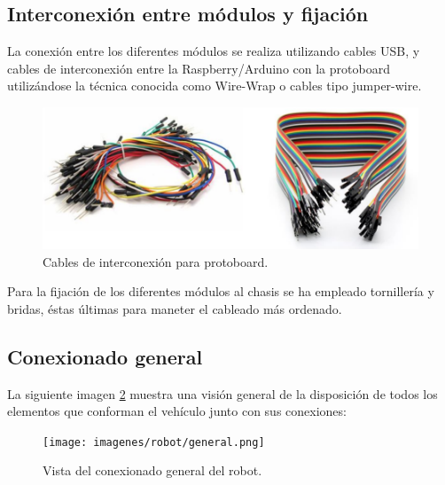 \subsection{Interconexión entre módulos y fijación}

La conexión entre los diferentes módulos se realiza utilizando cables USB, y cables de interconexión entre la Raspberry/Arduino con la protoboard utilizándose la técnica
conocida como Wire-Wrap o cables tipo jumper-wire.\\

\begin{figure}[H]
  \begin{center}
    \includegraphics[scale=0.3]{imagenes/cables_interconexion.png}
  \end{center}
  \caption{Cables de interconexión para protoboard.}
  \label{figura:cables_interconexion}
\end{figure}

Para la fijación de los diferentes módulos al chasis se ha empleado tornillería y bridas, éstas últimas para maneter el cableado más ordenado.\\

\subsection{Conexionado general}

La siguiente imagen \ref{vista-conexiones} muestra una visión general de la disposición de todos los elementos que conforman el vehículo junto con sus conexiones:\\


\begin{figure}[H]
  \begin{center}
   \texttt{[image: imagenes/robot/general.png]}
  \end{center}
  \caption{Vista del conexionado general del robot.}
  \label{vista-conexiones}
\end{figure}



